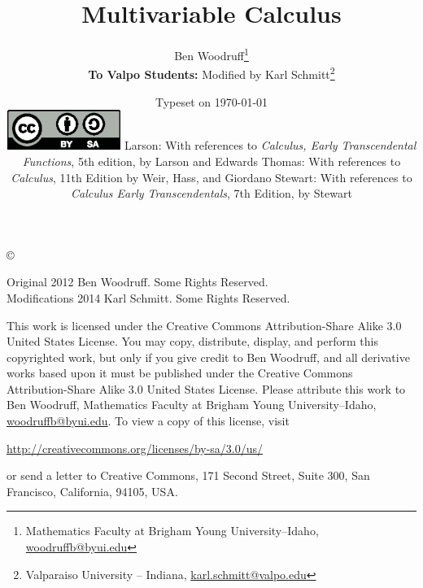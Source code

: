 \documentclass[letterpaper,oneside]{book}%
\newcommand{\valpo}[1]{\textbf{To Valpo Students:} #1}
\newcommand{\valpo}[1]{}
\newcommand{\thomasee}[1]{Thomas: #1}
\newcommand{\thomasee}[1]{}
\newcommand{\larsonfive}[1]{Larson: #1}
\newcommand{\larsonfive}[1]{}
\newcommand{\stewarts}[1]{Stewart: #1}
\newcommand{\stewarts}[1]{}
\theoremstyle{plain}
\theoremstyle{box}
\theoremstyle{problem}
\begin{document}
\frontmatter
\title{Multivariable Calculus}
\author{Ben Woodruff\thanks{Mathematics Faculty at Brigham Young
    University--Idaho, \url{woodruffb@byui.edu}}\\
		\valpo{Modified by Karl Schmitt\thanks{Valparaiso University -- Indiana, \url{karl.schmitt@valpo.edu}}}}
\date{Typeset on \today\\
\vfill
\includegraphics[height=1.3cm]{by-sa.eps}
\vfill
\larsonfive{With references to \emph{Calculus, Early Transcendental
    Functions}, 5th edition, by Larson and Edwards}
\thomasee{With references to \emph{Calculus}, 11th Edition by Weir, Hass, and Giordano}
\stewarts{With references to \emph{Calculus Early Transcendentals}, 7th Edition, by Stewart}}
\maketitle
\thispagestyle{empty}
\noindent\copyright{ Original 2012 Ben Woodruff.  Some Rights Reserved.\\
Modifications 2014 Karl Schmitt. Some Rights Reserved.

\bigskip

\noindent This work is licensed under the Creative Commons Attribution-Share Alike 3.0 United States License.  You may copy, distribute, display, and perform this copyrighted work, but only if you give credit to Ben Woodruff, and all derivative works based upon it must be published under the Creative Commons Attribution-Share Alike 3.0 United States License. Please attribute this work to Ben Woodruff, Mathematics Faculty at Brigham Young University--Idaho, \url{woodruffb@byui.edu}. To view a copy of this license, visit
\begin{center}
  \url{http://creativecommons.org/licenses/by-sa/3.0/us/}
\end{center}
or send a letter to Creative Commons, 171 Second Street, Suite 300, San Francisco, California, 94105, USA.}
\end{document}
